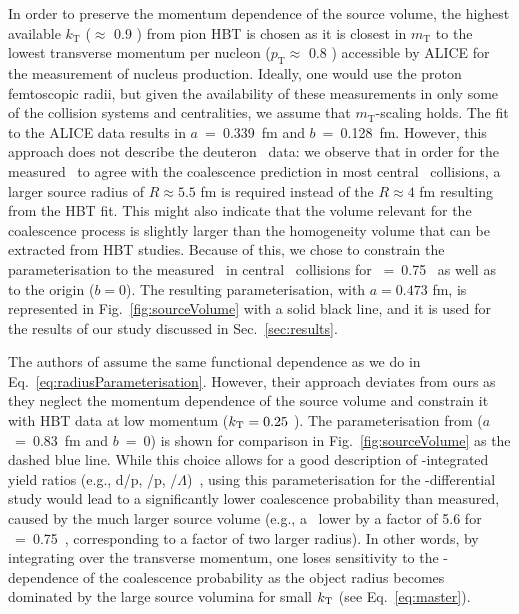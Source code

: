 \documentclass[%
 reprint,
 amsmath,amssymb,
 aps,
]{revtex4-1}
\begin{document}
%
In order to preserve the momentum dependence of the source volume, the highest available $k_{\mathrm{T}}$ ($\approx$ 0.9 \GeVc) from pion HBT is chosen as it is closest in $m_{\mathrm{T}}$ to the lowest transverse momentum per nucleon ($p_{\mathrm{T}} \approx$ 0.8 \GeVc) accessible by ALICE for the measurement of nucleus production. 
Ideally, one would use the proton femtoscopic radii, but given the availability of these measurements in only some of the collision systems and centralities, we assume that $m_{\mathrm{T}}$-scaling holds.
The fit to the ALICE data results in $a$~=~0.339~fm and $b$~=~0.128~fm.
However, this approach does not describe the deuteron \btwo~data: we observe that in order for the measured \btwo~to agree with the coalescence prediction in most central \PbPb~collisions, a larger source radius of $R \approx 5.5$ fm is required instead of the $R \approx 4$ fm resulting from the HBT fit.
This might also indicate that the volume relevant for the coalescence process is slightly larger than the homogeneity volume that can be extracted from HBT studies.
Because of this, we chose to constrain the parameterisation to the measured \btwo~in central \PbPb~collisions for \pt~=~0.75 \GeVc~as well as to the origin ($b = 0$). 
The resulting parameterisation, with $a = 0.473$ fm, is represented in Fig.~\ref{fig:sourceVolume} with a solid black line, and it is used for the results of our study discussed in Sec.~\ref{sec:results}.

The authors of \cite{Sun:2018mqq} assume the same functional dependence as we do in Eq.~\ref{eq:radiusParameterisation}. 
However, their approach deviates from ours as they neglect the momentum dependence of the source volume and constrain it with HBT data at low momentum ($k_{\rm T} = 0.25$ \GeVc). 
The parameterisation from \cite{Sun:2018mqq} ($a$~=~0.83~fm and $b$~=~0) is shown for comparison in Fig.~\ref{fig:sourceVolume} as the dashed blue line.
While this choice allows for a good description of \pt-integrated yield ratios (e.g., d/p, \hethree/p, \hthreelambda/$\Lambda$)~\cite{Sun:2018mqq}, using this parameterisation for the \pt-differential study would lead to a significantly lower coalescence probability than measured, caused by the much larger source volume (e.g., a \btwo~lower by a factor of 5.6 for \pt~=~0.75~\GeVc, corresponding to a factor of two larger radius). 
In other words, by integrating over the transverse momentum, one loses sensitivity to the \pt-dependence of the coalescence probability as the object radius becomes dominated by the large source volumina for small $k_{\rm T}$ (see Eq.~\ref{eq:master}).
\end{document}
